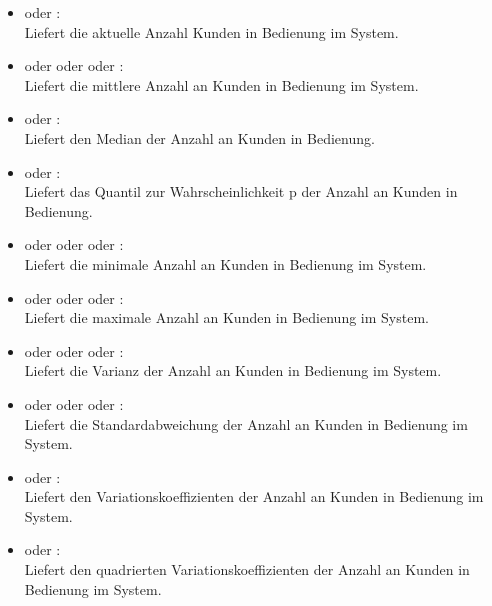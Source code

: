 \begin{itemize}    

\item
{} oder :\\
Liefert die aktuelle Anzahl Kunden in Bedienung im System.

\item
{} oder  oder  oder :\\
Liefert die mittlere Anzahl an Kunden in Bedienung im System.

\item
{} oder :\\
Liefert den Median der Anzahl an Kunden in Bedienung.

\item
{} oder :\\
Liefert das Quantil zur Wahrscheinlichkeit p der Anzahl an Kunden in Bedienung.

\item
{} oder  oder  oder :\\
Liefert die minimale Anzahl an Kunden in Bedienung im System.

\item
{} oder  oder  oder :\\
Liefert die maximale Anzahl an Kunden in Bedienung im System.

\item
{} oder  oder  oder :\\
Liefert die Varianz der Anzahl an Kunden in Bedienung im System.

\item
{} oder  oder  oder :\\
Liefert die Standardabweichung der Anzahl an Kunden in Bedienung im System.

\item
{} oder :\\
Liefert den Variationskoeffizienten der Anzahl an Kunden in Bedienung im System.

\item
{} oder :\\
Liefert den quadrierten Variationskoeffizienten der Anzahl an Kunden in Bedienung im System.


\end{itemize}
